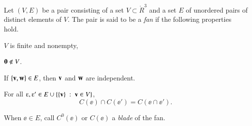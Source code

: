 \begin{definition}  
Let $(V,E)$ be a pair consisting of a set $V\subset \ring{R}^3$ and a set $E$ of unordered pairs of distinct elements of $V$.  The pair is said to be
a {\it fan\/} if the following properties hold.
    \begin{nomerate}
    \item {} $V$ is finite and  nonempty,
    \item {} ${\mathbf 0}\not\in V$.
    \item {} If $\{{\mathbf v},{\mathbf w}\} \in E$, then ${\mathbf v}$ and ${\mathbf w}$ are independent.
    \item {}
    For all $\ee ,\ee '\in E \cup \{\{\v\}\mid \v\in V\}$, 
 $$C(\ee )\cap C(\ee ') = C(\ee \cap \ee ').$$
    \end{nomerate}
When $\ee\in E$, call $C^0(\ee)$ or $C(\ee)$ a {\it blade\/} of the fan.
\end{definition}
%
%
%
%
%
%
\bigskip\hbox{~}\bigskip




